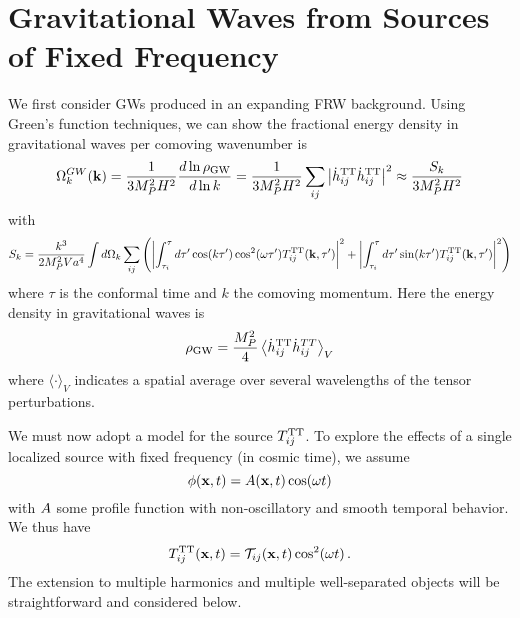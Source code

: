 \documentclass{revtex4}
\begin{document}
\section{Gravitational Waves from Sources of Fixed Frequency}
We first consider GWs produced in an expanding FRW background.
Using Green's function techniques, we can show the fractional energy density in gravitational waves per comoving wavenumber is
\begin{equation}
  \Omega_k^{GW}({\bf k}) = \frac{1}{3M_P^2H^2}\frac{d\ln\rho_{\rm GW}}{d\ln k} =  \frac{1}{3M_P^2H^2}\sum_{ij}\left|\dot{h}^{\rm TT}_{ij}\dot{h}_{ij}^{\rm TT}\right|^2 \approx \frac{S_k}{3M_P^2H^2}
\end{equation}
with
\begin{equation}
  S_k = \frac{k^3}{2M_P^2Va^4}\int d\Omega_k\sum_{ij}\left(\left|\int_{\tau_i}^\tau d\tau'\cos(k\tau')\cos^2(\omega \tau')T_{ij}^{{\rm TT}}({\bf k},\tau')\right|^2 + \left|\int_{\tau_i}^\tau d\tau'\sin(k\tau')T_{ij}^{{\rm TT}}({\bf k},\tau')\right|^2 \right)
\end{equation}
where $\tau$ is the conformal time and $k$ the comoving momentum.
Here the energy density in gravitational waves is
\begin{equation}
  \rho_{\rm GW} = \frac{M_P^2}{4}\left\langle\dot{h}_{ij}^{\rm TT}\dot{h}_{ij}^{TT}\right\rangle_V
\end{equation}
where $\langle\cdot\rangle_V$ indicates a spatial average over several wavelengths of the tensor perturbations.

We must now adopt a model for the source $T_{ij}^{{\rm TT}}$.
To explore the effects of a single localized source with fixed frequency (in cosmic time), we assume
\begin{equation}
  \phi({\bf x},t) = A({\bf x},t)\cos(\omega t)
\end{equation}
with $A$ some profile function with non-oscillatory and smooth temporal behavior.
We thus have
\begin{equation}
  T_{ij}^{{\rm TT}}({\bf x},t) = \mathcal{T}_{ij}({\bf x},t)\cos^2(\omega t) \, .
\end{equation}
The extension to multiple harmonics and multiple well-separated objects will be straightforward and considered below.
\end{document}
